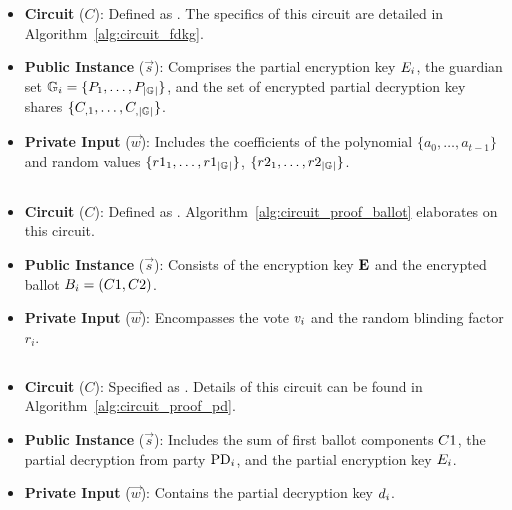 \documentclass[runningheads]{llncs}
\begin{document}
\begin{itemize}
    \item \textbf{Circuit} ($C$): Defined as \ProofFDKGInformal{}. The specifics of this circuit are detailed in Algorithm~\ref{alg:circuit_fdkg}.
    \item \textbf{Public Instance} ($\vec{s}$): Comprises the partial encryption key $E_{i}$, the guardian set $\mathbb{G}_{i} = \{P_{1},\dots,P_{|\mathbb{G}_{}|}\}$, and the set of encrypted partial decryption key shares $\{C_{,1},\dots, C_{,|\mathbb{G}_{}|}\}$.
    \item \textbf{Private Input} ($\vec{w}$): Includes the coefficients of the polynomial $\{a_0, \dots, a_{t-1}\}$ and random values $\{r1_1,\dots,r1_{|\mathbb{G}_{}|}\}$, $\{r2_1,\dots,r2_{|\mathbb{G}_{}|}\}$.
\end{itemize}

\subsection{}\label{sec:proof-ballot}

\begin{itemize}
    \item \textbf{Circuit} ($C$): Defined as \ProofBALLOTInformal{}. Algorithm~\ref{alg:circuit_proof_ballot} elaborates on this circuit.
    \item \textbf{Public Instance} ($\vec{s}$): Consists of the encryption key $\textbf{E}{}$ and the encrypted ballot $B_{i} = (C1, C2)$.
    \item \textbf{Private Input} ($\vec{w}$): Encompasses the vote $v_{i}$ and the random blinding factor $r_i$.
\end{itemize}

\subsection{}\label{sec:proof-pd}

\begin{itemize}
    \item \textbf{Circuit} ($C$): Specified as \ProofPDInformal{}. Details of this circuit can be found in Algorithm~\ref{alg:circuit_proof_pd}.
    \item \textbf{Public Instance} ($\vec{s}$): Includes the sum of first ballot components $C1{}$, the partial decryption from party $\mathrm{PD}_{i}$, and the partial encryption key $E_{i}$.
    \item \textbf{Private Input} ($\vec{w}$): Contains the partial decryption key $d_{i}$.
\end{itemize}
\end{document}
